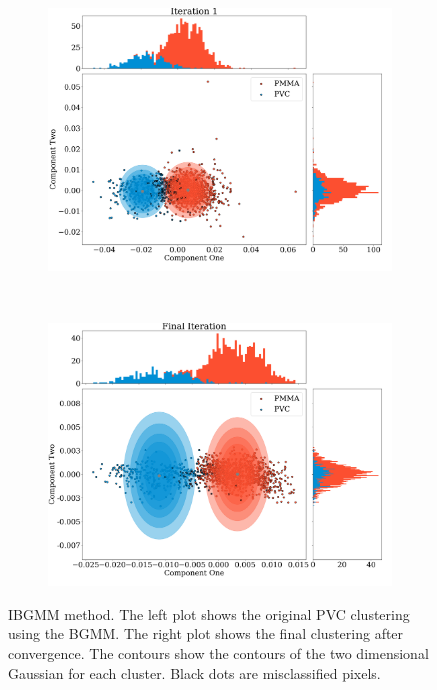 \documentclass[a4paper,11pt]{article}
\begin{document}
\begin{figure}[htbp]
    \centering
    \begin{subfigure}[b]{0.48\textwidth}
        \includegraphics[width=\textwidth]{figures/PCAsphericalbefore.png}
    \end{subfigure}
    ~ %
    \begin{subfigure}[b]{0.48\textwidth}
        \includegraphics[width=\textwidth]{figures/PCAsphericalafter.png}
    \end{subfigure}
    \caption{IBGMM method. The left plot shows the original PVC clustering using the BGMM. The right plot shows the final clustering after convergence. The contours show the contours of the two dimensional Gaussian for each cluster. Black dots are misclassified pixels.}
    \label{iterative_method}
\end{figure}
\end{document}
